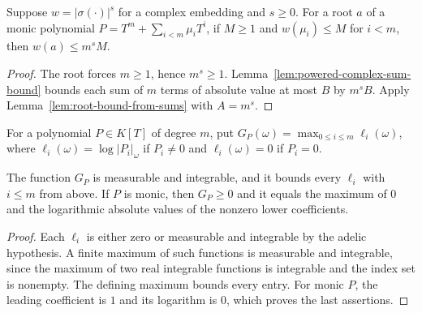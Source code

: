 \begin{lemma}\label{lem:archimedean-root-bound}
\leanok
{}
Suppose $w=|\sigma(\cdot)|^s$ for a complex embedding and $s\geq0$.
For a root $a$ of a monic polynomial
$P=T^m+\sum_{i<m}\mu_iT^i$, if $M\geq1$ and $w(\mu_i)\leq M$
for $i<m$, then $w(a)\leq m^sM$.
\end{lemma}
\begin{proof}
The root forces $m\geq1$, hence $m^s\geq1$.
Lemma~\ref{lem:powered-complex-sum-bound} bounds each sum of $m$
terms of absolute value at most $B$ by $m^sB$.
Apply Lemma~\ref{lem:root-bound-from-sums} with $A=m^s$.
\end{proof}

\begin{definition}\label{def:coefficient-log-envelope}
\leanok
{}
For a polynomial $P\in K[T]$ of degree $m$, put
$G_P(\omega)=\max_{0\leq i\leq m}\ell_i(\omega)$, where
$\ell_i(\omega)=\log|P_i|_\omega$ if $P_i\ne0$ and
$\ell_i(\omega)=0$ if $P_i=0$.
\end{definition}

\begin{lemma}\label{lem:coefficient-log-envelope}
\leanok
{}
The function $G_P$ is measurable and integrable, and it bounds every
$\ell_i$ with $i\leq m$ from above. If $P$ is monic, then $G_P\geq0$
and it equals the maximum of $0$ and the logarithmic absolute values
of the nonzero lower coefficients.
\end{lemma}
\begin{proof}
Each $\ell_i$ is either zero or measurable and integrable by the adelic
hypothesis. A finite maximum of such functions is measurable and
integrable, since the maximum of two real integrable functions is
integrable and the index set is nonempty. The defining maximum bounds
every entry. For monic $P$, the leading coefficient is $1$ and its
logarithm is $0$, which proves the last assertions.
\end{proof}

